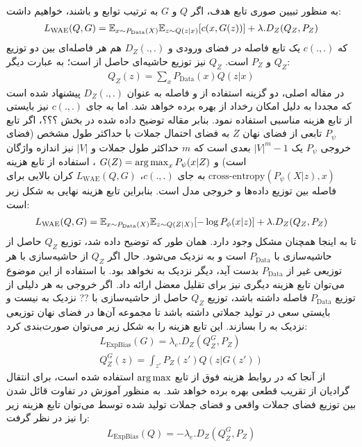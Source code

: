 \\
به منظور تبیین صوری تابع هدف، اگر $‎Q‎$  و $G$ به ترتیب توابع \encoder{} و \decoder{} باشند، خواهیم داشت:
\begin{gather}
L_{\text{WAE}}(Q, G) = \mathbb E_{x \sim P_{\text{Data}}(X)}\mathbb E_{z \sim Q(z|x)} [c(x, G(z))] + \lambda . D_ Z(Q_Z, P_Z)
\end{gather}
که $c(.,.)$ یک تابع فاصله در فضای ورودی و  $D_Z(. , .)$ هم هر فاصله‌ای بین دو توزیع $Q_Z$ و $P_Z$ است. $Q_Z$ نیز توزیع حاشیه‌ای حاصل از \encoder{} است؛ به عبارت دیگر:
\begin{gather}
Q_Z(z) = \sum_x P_{\text{Data}}(x) Q(z|x)
\end{gather}
در مقاله اصلی، دو گزینه استفاده از \gan{} و فاصله \mmd{} به عنوان $D_Z(.,.)$ پیشنهاد شده است که مجددا به دلیل امکان رخداد \modecollapse{} از \mmd{} بهره برده خواهد شد.
اما به جای $c(.,.)$ نیز بایستی از تابع هزینه مناسبی استفاده نمود. بنابر مقاله توضیح داده شده در بخش ؟؟؟، اگر تابع $P_\psi$ تابعی از فضای نهان $Z$ به فضای احتمال جملات با حداکثر طول مشخص
(فضای خروجی $P_\psi$ یک
 $|V|^m-1$
بعدی است که $m$ حداکثر طول جملات و $|V|$ نیز اندازه واژگان است) و 
$G(Z) = \operatorname*{arg\,max}_x P_\psi(x|Z)$
، استفاده از تابع هزینه 
$\text{cross-entropy}(P_\psi(X|z), x)$
 به جای $c(.,.)$، 
 $L_{\text{WAE}}(Q, G)$
 کران بالایی برای فاصله \wasser{} بین توزیع داده‌ها و خروجی مدل است.
بنابراین تابع هزینه نهایی به شکل زیر است:
\begin{gather}
L_{\text{WAE}}(Q, G) = \mathbb E_{x \sim P_{\text{Data}}(X)}\mathbb E_{z \sim Q(Z|X)} [-\log P_\phi(x|z)] + \lambda . D_ Z(Q_Z, P_Z)
\end{gather}
تا به اینجا همچنان مشکل \expbias{} وجود دارد. همان طور که توضیح داده شد، توزیع $Q_Z$ حاصل از حاشیه‌سازی با $P_\text{Data}$ است و به \priordist{} نزدیک می‌شود. حال اگر $Q_Z$ از حاشیه‌سازی  با هر توزیعی غیر از $P_\text{Data}$ بدست آید، دیگر نزدیک به \priordist{} نخواهد بود. با استفاده از این موضوع می‌توان تابع هزینه دیگری نیز برای تقلیل معضل \expbias{} ارائه داد. اگر خروجی \decoder{} به هر دلیلی از توزیع $P_\text{Data}$ فاصله داشته باشد، توزیع $Q_Z$ حاصل از حاشیه‌سازی با ?? نزدیک به \priordist{} نیست و \decoder{} بایستی سعی در تولید جملاتی داشته باشد تا مجموعه آن‌ها در فضای نهان توزیعی نزدیک به \priordist{} را بسازند. این تابع هزینه را به شکل زیر می‌توان صورت‌بندی کرد:
\begin{gather}
L_\text{ExpBias}(G) = \lambda_{e} . D_ Z(Q_Z^G, P_Z)
\\
Q_Z^G (z) = \int_{z'} P_Z(z') Q(z|G(z'))
\end{gather}
از آنجا که در روابط هزینه فوق از تابع $\operatorname*{arg\,max}$ استفاده شده است، برای انتقال گرادیان از تقریب قطعی  بهره برده خواهد شد. به منظور آموزش \encoder{} در تفاوت قائل شدن بین توزیع فضای جملات واقعی و فضای جملات تولید شده توسط \decoder{} می‌توان تابع هزینه زیر را نیز در نظر گرفت:
\begin{gather}
L_\text{ExpBias}(Q) = -\lambda_{e} . D_ Z(Q_Z^G, P_Z)
\end{gather}
